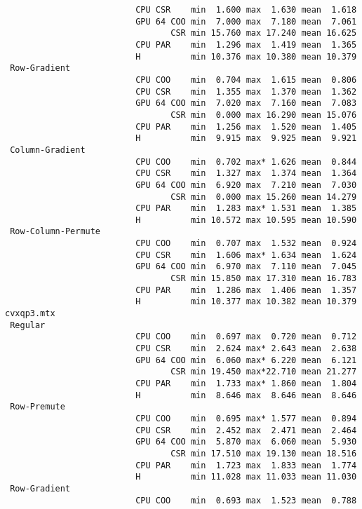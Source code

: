 \begin{verbatim}
                          CPU CSR    min  1.600 max  1.630 mean  1.618
                          GPU 64 COO min  7.000 max  7.180 mean  7.061
                                 CSR min 15.760 max 17.240 mean 16.625
                          CPU PAR    min  1.296 max  1.419 mean  1.365
                          H          min 10.376 max 10.380 mean 10.379
 Row-Gradient
                          CPU COO    min  0.704 max  1.615 mean  0.806
                          CPU CSR    min  1.355 max  1.370 mean  1.362
                          GPU 64 COO min  7.020 max  7.160 mean  7.083
                                 CSR min  0.000 max 16.290 mean 15.076
                          CPU PAR    min  1.256 max  1.520 mean  1.405
                          H          min  9.915 max  9.925 mean  9.921
 Column-Gradient
                          CPU COO    min  0.702 max* 1.626 mean  0.844
                          CPU CSR    min  1.327 max  1.374 mean  1.364
                          GPU 64 COO min  6.920 max  7.210 mean  7.030
                                 CSR min  0.000 max 15.260 mean 14.279
                          CPU PAR    min  1.283 max* 1.531 mean  1.385
                          H          min 10.572 max 10.595 mean 10.590
 Row-Column-Permute
                          CPU COO    min  0.707 max  1.532 mean  0.924
                          CPU CSR    min  1.606 max* 1.634 mean  1.624
                          GPU 64 COO min  6.970 max  7.110 mean  7.045
                                 CSR min 15.850 max 17.310 mean 16.783
                          CPU PAR    min  1.286 max  1.406 mean  1.357
                          H          min 10.377 max 10.382 mean 10.379
cvxqp3.mtx
 Regular
                          CPU COO    min  0.697 max  0.720 mean  0.712
                          CPU CSR    min  2.624 max* 2.643 mean  2.638
                          GPU 64 COO min  6.060 max* 6.220 mean  6.121
                                 CSR min 19.450 max*22.710 mean 21.277
                          CPU PAR    min  1.733 max* 1.860 mean  1.804
                          H          min  8.646 max  8.646 mean  8.646
 Row-Premute
                          CPU COO    min  0.695 max* 1.577 mean  0.894
                          CPU CSR    min  2.452 max  2.471 mean  2.464
                          GPU 64 COO min  5.870 max  6.060 mean  5.930
                                 CSR min 17.510 max 19.130 mean 18.516
                          CPU PAR    min  1.723 max  1.833 mean  1.774
                          H          min 11.028 max 11.033 mean 11.030
 Row-Gradient
                          CPU COO    min  0.693 max  1.523 mean  0.788

\end{verbatim}
